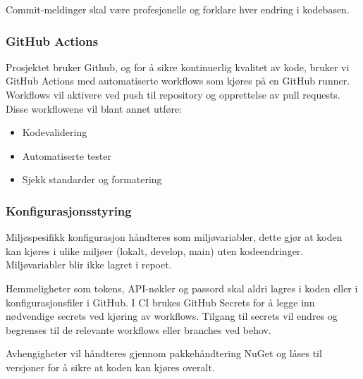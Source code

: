 Commit-meldinger skal være profesjonelle og forklare hver endring i kodebasen.

\subsubsection{GitHub Actions}
Prosjektet bruker Github, og for å sikre kontinuerlig kvalitet av kode, bruker vi GitHub Actions med automatiserte workflows som kjøres på en GitHub runner. Workflows vil aktivere ved push til repository og opprettelse av pull requests. Disse workflowene vil blant annet utføre:
\begin{itemize}
    \item Kodevalidering
    \item Automatiserte tester
    \item Sjekk standarder og formatering
\end{itemize}


%

\subsubsection{Konfigurasjonsstyring}
Miljøspesifikk konfigurasjon håndteres som miljøvariabler, dette gjør at koden kan kjøres i ulike miljøer (lokalt, develop, main) uten kodeendringer. Miljøvariabler blir ikke lagret i repoet.


Hemmeligheter som tokens, API-nøkler og passord skal aldri lagres i koden eller i konfigurasjonsfiler i GitHub. I CI brukes GitHub Secrets for å legge inn nødvendige secrets ved kjøring av workflows. Tilgang til secrets vil endres og begrenses til de relevante workflows eller branches ved behov.


Avhengigheter vil håndteres gjennom pakkehåndtering NuGet og låses til versjoner for å sikre at koden kan kjøres overalt.


